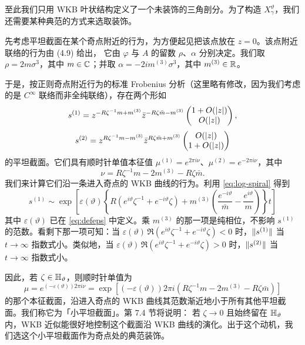 至此我们只用 WKB 叶状结构定义了一个未装饰的三角剖分。为了构造 $X^\vartheta_\gamma$，我们还需要某种典范的方式来选取装饰。

先考虑平坦截面在某个奇点附近的行为，为方便起见把该点放在 $z=0$。该点附近联络的行为由 (4.9) 给出，%
它由 $\varphi$ 与 $A$ 的留数 $\rho$、$\alpha$ 分别决定。我们取 $\rho = 2m\sigma^3$，其中 $m \in \mathbb{C}$；并取 $\alpha = -2i m^{(3)}\sigma^3$，其中 $m^{(3)} \in \mathbb{R}$。

于是，按正则奇点附近行为的标准 Frobenius 分析（这里略有修改，因为我们考虑的是 $C^\infty$ 联络而非全纯联络），存在两个形如
\begin{equation} \label{eq:small-flat-1}
s^{(1)} = z^{-R \zeta^{-1} m + m^{(3)}} \bar{z}^{-R \zeta \bar{m} - m^{(3)}} \begin{pmatrix} 1 + O(\lvert z \rvert) \\ O(\lvert z \rvert) \end{pmatrix},
\end{equation}
\begin{equation} \label{eq:small-flat-2}
s^{(2)} = z^{R \zeta^{-1} m - m^{(3)}} \bar{z}^{R \zeta \bar{m} + m^{(3)}} \begin{pmatrix} O(\lvert z \rvert) \\ 1 + O(\lvert z \rvert) \end{pmatrix}
\end{equation}
的平坦截面。它们具有顺时针单值本征值 $\mu^{(1)} = e^{2\pi i\nu}$、$\mu^{(2)} = e^{-2\pi i\nu}$，其中
\begin{equation} \label{eq:nu}
\nu = R \zeta^{-1} m - 2 m^{(3)} - R \zeta \bar{m}.
\end{equation}
我们来计算它们沿一条进入奇点的 WKB 曲线的行为。利用 \eqref{eq:log-spiral} 得到
\begin{equation} \label{eq:small-flat-3}
s^{(1)} \sim \exp \left[ \varepsilon(\vartheta) \left\{ R (e^{i\vartheta}\zeta^{-1} + e^{-i\vartheta}\zeta) + m^{(3)} \left( \frac{e^{-i\vartheta}}{\bar m} - \frac{e^{i\vartheta}}{m} \right) \right\} t \right]
\end{equation}
其中 $\varepsilon(\vartheta)$ 已在 \eqref{eq:defeps} 中定义。乘 $m^{(3)}$ 的那一项是纯相位，不影响 $s^{(1)}$ 的范数。看剩下那一项可知：当 $\varepsilon(\vartheta)\,\Re (e^{i\vartheta}\zeta^{-1} + e^{-i\vartheta}\zeta) < 0$ 时，$\lVert s^{(1)} \rVert$ 当 $t \to \infty$ 指数式小。类似地，当 $\varepsilon(\vartheta)\,\Re (e^{i\vartheta}\zeta^{-1} + e^{-i\vartheta}\zeta) > 0$ 时，$\lVert s^{(2)} \rVert$ 当 $t \to \infty$ 指数式小。

因此，若 $\zeta \in {\mathbb{H}}_\vartheta$，则顺时针单值为
\begin{equation} \label{eq:monodromy-formula}
\mu = e^{(-\varepsilon(\vartheta)) 2\pi i\nu} = \exp \left[(-\varepsilon(\vartheta)) 2\pi i \left( R \zeta^{-1} m - 2 m^{(3)} - R \zeta \bar{m} \right) \right]
\end{equation}
的那个本征截面，沿进入奇点的 WKB 曲线其范数渐近地小于所有其他平坦截面。我们称它为「小平坦截面」。第 7.4 节将说明：%
若 $\zeta \to 0$ 且始终留在 ${\mathbb{H}}_\vartheta$ 内，WKB 近似能很好地控制这个截面沿 WKB 曲线的演化。出于这个动机，我们选这个小平坦截面作为奇点处的典范装饰。


